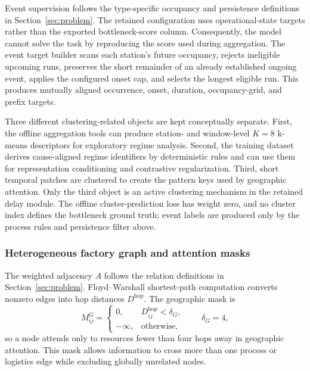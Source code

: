 \documentclass[a4paper,fleqn]{cas-dc}
\begin{document}
Event supervision follows the type-specific occupancy and persistence definitions in Section~\ref{sec:problem}. The retained configuration uses operational-state targets rather than the exported bottleneck-score column. Consequently, the model cannot solve the task by reproducing the score used during aggregation. The event target builder scans each station's future occupancy, rejects ineligible upcoming runs, preserves the short remainder of an already established ongoing event, applies the configured onset cap, and selects the longest eligible run. This produces mutually aligned occurrence, onset, duration, occupancy-grid, and prefix targets.


Three different clustering-related objects are kept conceptually separate. First, the offline aggregation tools can produce station- and window-level $K=8$ k-means descriptors for exploratory regime analysis. Second, the training dataset derives cause-aligned regime identifiers by deterministic rules and can use them for representation conditioning and contrastive regularization. Third, short temporal patches are clustered to create the pattern keys used by geographic attention. Only the third object is an active clustering mechanism in the retained delay module. The offline cluster-prediction loss has weight zero, and no cluster index defines the bottleneck ground truth; event labels are produced only by the process rules and persistence filter above.


\subsubsection{Heterogeneous factory graph and attention masks}

The weighted adjacency $A$ follows the relation definitions in Section~\ref{sec:problem}. Floyd--Warshall shortest-path computation converts nonzero edges into hop distances $D^{\mathrm{hop}}$. The geographic mask is
\begin{equation}
M^G_{ij}=
\begin{cases}
0, & D^{\mathrm{hop}}_{ij}<\delta_G,\\
-\infty, & \text{otherwise},
\end{cases}
\qquad \delta_G=4,
\end{equation}
so a node attends only to resources fewer than four hops away in geographic attention. This mask allows information to cross more than one process or logistics edge while excluding globally unrelated nodes.
\end{document}
